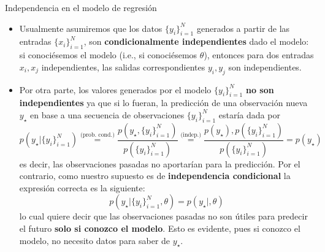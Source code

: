 \documentclass[9pt]{beamer}
\begin{document}
\begin{frame}{Independencia en el modelo de regresión}

\begin{itemize}
	\item Usualmente asumiremos que los datos $\{y_i\}_{i=1}^N$ generados a partir de las entradas $\{x_i\}_{i=1}^N$, son \textbf{condicionalmente independientes} dado el modelo: si conociésemos el modelo (i.e., si conociésemos $\theta$), entonces para dos entradas $x_i,x_j$ independientes, las  salidas correspondientes $y_i,y_j$ son independientes.\pause
	\item  Por otra parte, los valores generados por el modelo $\{y_i\}_{i=1}^N$ \textbf{no son independientes} ya que si lo fueran, la predicción de una observación nueva $y_\star$ en base a una secuencia de observaciones $\{y_i\}_{i=1}^N$ estaría dada por
\begin{equation*}
	p(y_\star|\{y_i\}_{i=1}^N) 
	\stackrel{\text{(prob. cond.)}}{=} \frac{p(y_\star,\{y_i\}_{i=1}^N)} {p(\{y_i\}_{i=1}^N)} 
	\stackrel{\text{(indep.)}}{=} \frac{p(y_\star),p(\{y_i\}_{i=1}^N)} {p(\{y_i\}_{i=1}^N)}
	=p(y_\star)
\end{equation*}
es decir, las observaciones pasadas no aportarían para la predicción. \pause Por  el contrario, como nuestro supuesto es de \textbf{independencia condicional} la expresión correcta es  la siguiente: 
\begin{equation*}
	p(y_\star|\{y_i\}_{i=1}^N,\theta)  
	=p(y_\star|,\theta)
\end{equation*}\pause
lo cual quiere decir que las  observaciones pasadas no son útiles para predecir el  futuro \textbf{solo si conozco el modelo}. Esto es evidente, pues si conozco el modelo, no necesito datos para saber de $y_\star$.

\end{itemize}
	
\end{frame}
\end{document}
